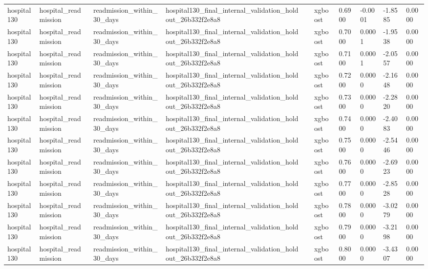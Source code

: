 \begin{tabular}{llllllllll}
hospital130 & hospital\_readmission & readmission\_within\_30\_days & hospital130\_final\_internal\_validation\_holdout\_26b332f2e8a8 &  & xgboost & 0.6900 & -0.0001 & -1.8585 & 0.0000 \\
hospital130 & hospital\_readmission & readmission\_within\_30\_days & hospital130\_final\_internal\_validation\_holdout\_26b332f2e8a8 &  & xgboost & 0.7000 & 0.0001 & -1.9538 & 0.0000 \\
hospital130 & hospital\_readmission & readmission\_within\_30\_days & hospital130\_final\_internal\_validation\_holdout\_26b332f2e8a8 &  & xgboost & 0.7100 & 0.0001 & -2.0557 & 0.0000 \\
hospital130 & hospital\_readmission & readmission\_within\_30\_days & hospital130\_final\_internal\_validation\_holdout\_26b332f2e8a8 &  & xgboost & 0.7200 & 0.0000 & -2.1648 & 0.0000 \\
hospital130 & hospital\_readmission & readmission\_within\_30\_days & hospital130\_final\_internal\_validation\_holdout\_26b332f2e8a8 &  & xgboost & 0.7300 & 0.0000 & -2.2820 & 0.0000 \\
hospital130 & hospital\_readmission & readmission\_within\_30\_days & hospital130\_final\_internal\_validation\_holdout\_26b332f2e8a8 &  & xgboost & 0.7400 & 0.0000 & -2.4083 & 0.0000 \\
hospital130 & hospital\_readmission & readmission\_within\_30\_days & hospital130\_final\_internal\_validation\_holdout\_26b332f2e8a8 &  & xgboost & 0.7500 & 0.0000 & -2.5446 & 0.0000 \\
hospital130 & hospital\_readmission & readmission\_within\_30\_days & hospital130\_final\_internal\_validation\_holdout\_26b332f2e8a8 &  & xgboost & 0.7600 & 0.0000 & -2.6923 & 0.0000 \\
hospital130 & hospital\_readmission & readmission\_within\_30\_days & hospital130\_final\_internal\_validation\_holdout\_26b332f2e8a8 &  & xgboost & 0.7700 & 0.0000 & -2.8528 & 0.0000 \\
hospital130 & hospital\_readmission & readmission\_within\_30\_days & hospital130\_final\_internal\_validation\_holdout\_26b332f2e8a8 &  & xgboost & 0.7800 & 0.0000 & -3.0279 & 0.0000 \\
hospital130 & hospital\_readmission & readmission\_within\_30\_days & hospital130\_final\_internal\_validation\_holdout\_26b332f2e8a8 &  & xgboost & 0.7900 & 0.0000 & -3.2198 & 0.0000 \\
hospital130 & hospital\_readmission & readmission\_within\_30\_days & hospital130\_final\_internal\_validation\_holdout\_26b332f2e8a8 &  & xgboost & 0.8000 & 0.0000 & -3.4307 & 0.0000 \\
\hline
\end{tabular}
